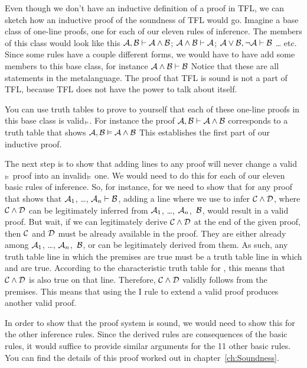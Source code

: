 Even though we don't have an inductive definition of a proof in TFL, we can sketch how an inductive proof of the soundness of TFL would go. Imagine a base class of one-line proofs, one for each of our eleven rules of inference. The members of this class would look like this $\mathcal{A}, \mathcal{B} \vdash  \mathcal{A} \wedge \mathcal{B}$; $\mathcal{A} \wedge \mathcal{B} \vdash \mathcal{A}$; $\mathcal{A} \vee \mathcal{B}, \neg\mathcal{A} \vdash  \mathcal{B}$ \ldots{} etc. Since some rules have a couple different forms, we would have to have add some members to this base class, for instance $\mathcal{A} \wedge \mathcal{B} \vdash  \mathcal{B}$ Notice that these are all statements in the metalanguage. The proof that TFL is sound is not a part of TFL, because TFL does not have the power to talk about itself.

You can use truth tables to prove to yourself that each of these one-line proofs in this base class is valid$_{\vDash}$. For instance the proof $\mathcal{A}, \mathcal{B} \vdash \mathcal{A} \wedge \mathcal{B}$ corresponds to a truth table that shows $\mathcal{A}, \mathcal{B} \vDash  \mathcal{A} \wedge \mathcal{B}$ This establishes the first part of our inductive proof.

The next step is to show that adding lines to any proof will never
change a valid$_{\vDash}$ proof into an invalid$_{\vDash}$ one. We
would need to do this for each of our eleven basic rules of inference.
So, for instance, for  we need to show that for any proof that
shows that $\mathcal{A}_{1}$, \dots, $\mathcal{A}_{n} \vdash  \mathcal{B}$,
adding a line where we use  to infer $\mathcal{C} \wedge
\mathcal{D}$, where $\mathcal{C} \wedge \mathcal{D}$ can be legitimately
inferred from $\mathcal{A}_{1}$, \dots, $\mathcal{A}_{n}$,~$\mathcal{B}$,
would result in a valid proof. But wait, if we
can legitimately derive $\mathcal{C} \wedge \mathcal{D}$ at the end of the
given proof, then $\mathcal{C}$ and $\mathcal{D}$ must be already available
in the proof. They are either already among $\mathcal{A}_{1}$, \dots,
$\mathcal{A}_{n}$,~$\mathcal{B}$, or can be legitimately derived from
them. As such, any truth table line in which the premises are true
must be a truth table line in which  and  are true.
According to the characteristic truth table for \eand, this means that
$\mathcal{C} \wedge \mathcal{D}$ is also true on that line. Therefore,
$\mathcal{C} \wedge \mathcal{D}$ validly follows from the premises. This
means that using the {\eand}I rule to extend a valid proof produces
another valid proof.

In order to show that the proof system is sound, we would need to show
this for the other inference rules. Since the derived rules are
consequences of the basic rules, it would suffice to provide similar
arguments for the 11 other basic rules. You can find the details of
this proof worked out in chapter~\ref{ch:Soundness}.

